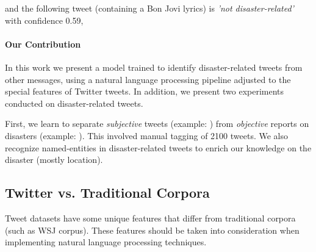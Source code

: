 \documentclass[letterpaper,twocolumn,10pt]{article}
\begin{document}
\begin{center}
	\parbox{190pt}{}
\end{center}


and the following tweet (containing a Bon Jovi lyrics) is \textit{'not disaster-related'} with confidence 0.59,

\begin{center}
	\parbox{190pt}{}
\end{center}


\paragraph{Our Contribution}


In this work we present a model trained to identify disaster-related tweets from other messages, using a natural language processing pipeline adjusted to the special features of Twitter tweets. In addition, we present two experiments conducted on disaster-related tweets.

 First, we learn to separate \textit{subjective} tweets (example: ) from \textit{objective} reports on disasters (example: ). This involved manual tagging of 2100 tweets. We also recognize named-entities in disaster-related tweets to enrich our knowledge on the disaster (mostly location).



\subsection{Twitter vs. Traditional Corpora}

Tweet datasets have some unique features that differ from traditional corpora (such as WSJ corpus). These features should be taken into consideration when implementing natural language processing techniques.

\end{document}
